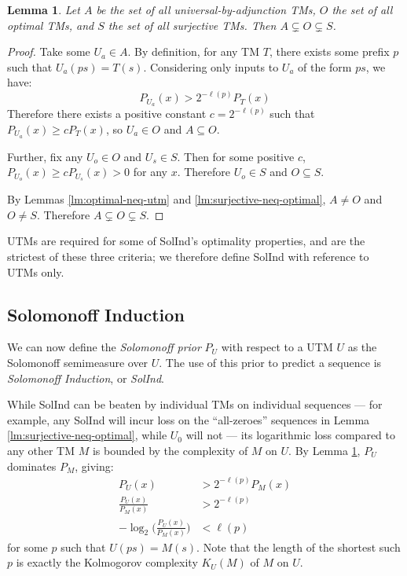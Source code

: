 \documentclass[11pt]{article}
\newtheorem{lemma}{Lemma}[section]
\begin{document}
\begin{lemma}
\label{lm:universal-subsets}
    Let $A$ be the set of all universal-by-adjunction TMs, $O$ the set of all optimal TMs, and $S$ the set of all surjective TMs.
    Then $A\subsetneq O\subsetneq S$.
\end{lemma}
\begin{proof}
    Take some $U_a\in A$. By definition, for any TM $T$, there exists some prefix $p$ such that $U_a(ps)=T(s)$.
    Considering only inputs to $U_a$ of the form $ps$, we have:
    \[
        P_{U_a}(x) > 2^{-\ell(p)}P_T(x)
    \]
    Therefore there exists a positive constant $c=2^{-\ell(p)}$ such that $P_{U_a}(x)\geq cP_T(x)$, so $U_a \in O$ and $A\subseteq O$.

    Further, fix any $U_o\in O$ and $U_s \in S$. Then for some positive $c$, $P_{U_o}(x)\geq cP_{U_s}(x)>0$ for any $x$. Therefore $U_o \in S$ and $O\subseteq S$.

    By Lemmas \ref{lm:optimal-neq-utm} and \ref{lm:surjective-neq-optimal}, $A\neq O$ and $O\neq S$.
    Therefore $A\subsetneq O\subsetneq S$.
\end{proof}

UTMs are required for some of SolInd's optimality properties, and are the strictest of these three criteria; we therefore define SolInd with reference to UTMs only.

\subsection{Solomonoff Induction}
We can now define the \textit{Solomonoff prior} $P_U$ with respect to a UTM $U$ as the Solomonoff semimeasure over $U$.
The use of this prior to predict a sequence is \textit{Solomonoff Induction}, or \textit{SolInd}.

While SolInd can be beaten by individual TMs on individual sequences --- for example, any SolInd will incur loss on the ``all-zeroes'' sequences in Lemma \ref{lm:surjective-neq-optimal}, while $U_0$ will not --- its logarithmic loss compared to any other TM $M$ is bounded by the complexity of $M$ on $U$.
By Lemma \ref{lm:universal-subsets}, $P_U$ dominates $P_M$, giving:
\begin{align*}
P_U(x) &> 2^{-\ell(p)} P_M(x) \\
\frac{P_U(x)}{P_M(x)} &> 2^{-\ell(p)} \\
-\log_2\bigl(\frac{P_U(x)}{P_M(x)}\bigr) &< \ell(p)
\end{align*}
for some $p$ such that $U(ps)=M(s)$.
Note that the length of the shortest such $p$ is exactly the Kolmogorov complexity $K_U(M)$ of $M$ on $U$.
\end{document}
